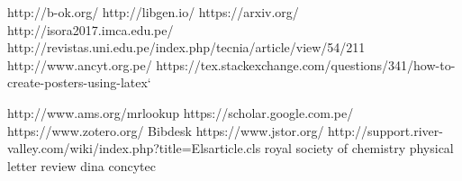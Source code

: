 http://b-ok.org/
http://libgen.io/
https://arxiv.org/
http://isora2017.imca.edu.pe/
http://revistas.uni.edu.pe/index.php/tecnia/article/view/54/211
http://www.ancyt.org.pe/
https://tex.stackexchange.com/questions/341/how-to-create-posters-using-latex`

\maketitle
\nocite{asterisk}



\listoftables
\tableofcontents
\listoffigures
\listfiles
http://www.ams.org/mrlookup
https://scholar.google.com.pe/
https://www.zotero.org/
Bibdesk
https://www.jstor.org/
http://support.river-valley.com/wiki/index.php?title=Elsarticle.cls
royal society of chemistry
physical letter review
dina concytec
